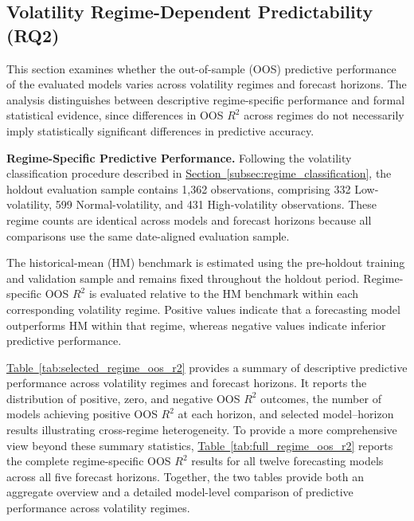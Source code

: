 \documentclass[12pt,twoside]{ord}
\makeatletter
\providecommand{\FloatBarrier}{\par\ifx\@deferlist\@empty\else\clearpage\fi}
\makeatother
\begin{document}
\FloatBarrier
\subsection{Volatility Regime-Dependent Predictability (RQ2)}\label{subsec:volatility_regimes}

This section examines whether the out-of-sample (OOS) predictive performance of the evaluated models varies across volatility regimes and forecast horizons. The analysis distinguishes between descriptive regime-specific performance and formal statistical evidence, since differences in OOS $R^2$ across regimes do not necessarily imply statistically significant differences in predictive accuracy.

\medskip
\noindent\textbf{Regime-Specific Predictive Performance.}
Following the volatility classification procedure described in \hyperref[subsec:regime_classification]{Section~\ref*{subsec:regime_classification}}, the holdout evaluation sample contains 1,362 observations, comprising 332 Low-volatility, 599 Normal-volatility, and 431 High-volatility observations. These regime counts are identical across models and forecast horizons because all comparisons use the same date-aligned evaluation sample.

The historical-mean (HM) benchmark is estimated using the pre-holdout training and validation sample and remains fixed throughout the holdout period. Regime-specific OOS $R^2$ is evaluated relative to the HM benchmark within each corresponding volatility regime. Positive values indicate that a forecasting model outperforms HM within that regime, whereas negative values indicate inferior predictive performance.

\hyperref[tab:selected_regime_oos_r2]{Table~\ref*{tab:selected_regime_oos_r2}} provides a summary of descriptive predictive performance across volatility regimes and forecast horizons. It reports the distribution of positive, zero, and negative OOS $R^2$ outcomes, the number of models achieving positive OOS $R^2$ at each horizon, and selected model--horizon results illustrating cross-regime heterogeneity. To provide a more comprehensive view beyond these summary statistics, \hyperref[tab:full_regime_oos_r2]{Table~\ref*{tab:full_regime_oos_r2}} reports the complete regime-specific OOS $R^2$ results for all twelve forecasting models across all five forecast horizons. Together, the two tables provide both an aggregate overview and a detailed model-level comparison of predictive performance across volatility regimes.
\end{document}
